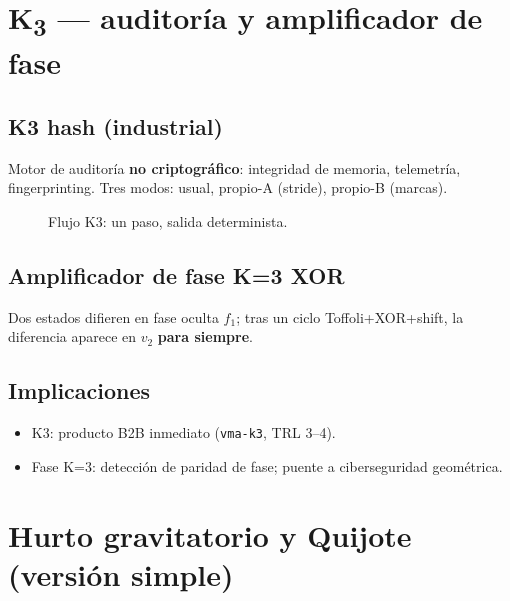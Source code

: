 \documentclass[11pt,a4paper,twoside]{book}
\newcommand{\Kthree}{K\textsubscript{3}}
\begin{document}
\chapter{\Kthree{} — auditoría y amplificador de fase}

\section{K3 hash (industrial)}
Motor de auditoría \textbf{no criptográfico}: integridad de memoria, telemetría,
fingerprinting. Tres modos: usual, propio-A (stride), propio-B (marcas).

\begin{figure}[htbp]
\centering
{}
\caption{Flujo K3: un paso, salida determinista.}
\end{figure}

\section{Amplificador de fase K=3 XOR}
Dos estados difieren en fase oculta $f_1$; tras un ciclo Toffoli+XOR+shift,
la diferencia aparece en $v_2$ \textbf{para siempre}.

\section{Implicaciones}
\begin{itemize}[noitemsep]
  \item K3: producto B2B inmediato (\texttt{vma-k3}, TRL 3--4).
  \item Fase K=3: detección de paridad de fase; puente a ciberseguridad geométrica.
\end{itemize}

\chapter{Hurto gravitatorio y Quijote (versión simple)}
\end{document}
